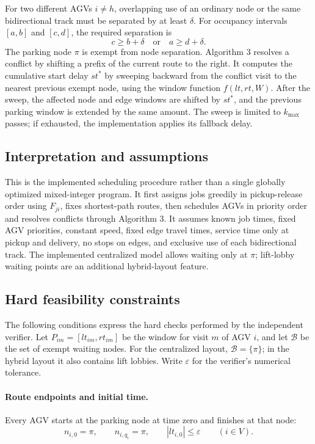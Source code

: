For two different AGVs $i\ne h$, overlapping use of an ordinary node or the
same bidirectional track must be separated by at least $\delta$. For occupancy
intervals $[a,b]$ and $[c,d]$, the required separation is
\[
  c\ge b+\delta
  \quad\text{or}\quad
  a\ge d+\delta.
\]
The parking node $\pi$ is exempt from node separation. Algorithm 3 resolves a
conflict by shifting a prefix of the current route to the right. It computes
the cumulative start delay $st^*$ by sweeping backward from the conflict visit
to the nearest previous exempt node, using the window function
$f(lt,rt,W)$. After the sweep, the affected node and edge windows are shifted
by $st^*$, and the previous parking window is extended by the same amount. The
sweep is limited to $k_{\max}$ passes; if exhausted, the implementation applies
its fallback delay.

\subsection{Interpretation and assumptions}

This is the implemented scheduling procedure rather than a single globally
optimized mixed-integer program. It first assigns jobs greedily in pickup-release order
using $F_{ji}$, fixes shortest-path routes, then schedules AGVs in priority
order and resolves conflicts through Algorithm 3. It assumes known job times,
fixed AGV priorities, constant speed, fixed edge travel times, service time
only at pickup and delivery, no stops on edges, and exclusive use of each
bidirectional track. The implemented centralized model allows waiting only at
$\pi$; lift-lobby waiting points are an additional hybrid-layout feature.

\subsection{Hard feasibility constraints}

The following conditions express the hard checks performed by the independent
verifier. Let $P_{im}=[lt_{im},rt_{im}]$ be the window for
visit $m$ of AGV $i$, and let $\mathcal{B}$ be the set of exempt waiting nodes.
For the centralized layout, $\mathcal{B}=\{\pi\}$; in the hybrid layout it
also contains lift lobbies. Write $\varepsilon$ for the verifier's numerical
tolerance.

\paragraph{Route endpoints and initial time.}
Every AGV starts at the parking node at time zero and finishes at that node:
\[
  n_{i,0}=\pi,\qquad n_{i,q_i}=\pi,\qquad |lt_{i,0}|\le\varepsilon
  \qquad (i\in V).
\]

